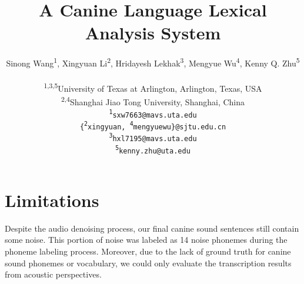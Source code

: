 \documentclass[11pt]{article}
\title{A Canine Language Lexical Analysis System}
\author{Sinong Wang\textsuperscript{1},
Xingyuan Li\textsuperscript{2}, 
Hridayesh Lekhak\textsuperscript{3},
Mengyue Wu\textsuperscript{4}, Kenny Q. Zhu\textsuperscript{5} \\ \\ 
  \textsuperscript{1,3,5}University of Texas at Arlington, Arlington, Texas, USA \\
  \textsuperscript{2,4}Shanghai Jiao Tong University, Shanghai, China \\
  \texttt{\textsuperscript{1}sxw7663@mavs.uta.edu}\\
  \texttt{\{\textsuperscript{2}xingyuan, \textsuperscript{4}mengyuewu\}@sjtu.edu.cn}\\
  \texttt{\textsuperscript{3}hxl7195@mavs.uta.edu}\\
  \texttt{\textsuperscript{5}kenny.zhu@uta.edu}\\}
\begin{document}
\maketitle














\section*{Limitations}

Despite the audio denoising process, our final canine sound sentences still contain some noise. This portion of noise was labeled as 14 noise phonemes during the phoneme labeling process. Moreover, due to the lack of ground truth for canine sound phonemes or vocabulary, we could only evaluate the transcription results from acoustic perspectives.








%


%


\end{document}
